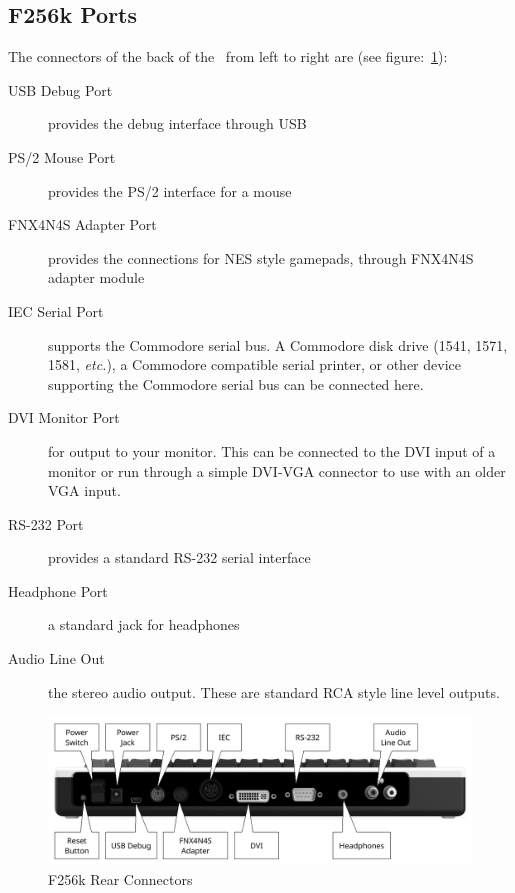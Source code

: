 \subsection*{F256k Ports}

The connectors of the back of the \fk\ from left to right are (see figure:~\ref{fig:rear_k}):

\begin{description}
    \item[USB Debug Port] provides the debug interface through USB
    
    \item[PS/2 Mouse Port] provides the PS/2 interface for a mouse
    
    \item[FNX4N4S Adapter Port] provides the connections for NES style gamepads, through FNX4N4S adapter module
    
    \item[IEC Serial Port] supports the Commodore serial bus. A Commodore disk drive (1541, 1571, 1581, {\it etc.}), a Commodore compatible serial printer, or other device supporting the Commodore serial bus can be connected here.

    \item[DVI Monitor Port] for output to your monitor. This can be connected to the DVI input of a monitor or run through a simple DVI-VGA connector to use with an older VGA input.
    
    \item[RS-232 Port] provides a standard RS-232 serial interface
    
    \item[Headphone Port] a standard jack for headphones

    \item[Audio Line Out] the stereo audio output. These are standard RCA style line level outputs.
\end{description}

\begin{figure}[ht]
    \begin{center}
        \includegraphics[scale=0.75]{images/f256k_back_annotated.pdf}
    \end{center}
    \caption{F256k Rear Connectors}
    \label{fig:rear_k}
\end{figure}

